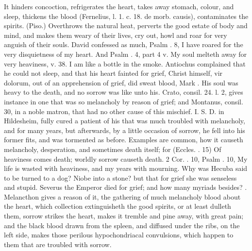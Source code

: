 {It hinders concoction, refrigerates the heart, takes away
stomach, colour, and sleep, thickens the blood (Fernelius, l. 1.
c. 18. \textlatin{de morb. causis}), contaminates the spirits. (Piso.)
Overthrows the natural heat, perverts the good estate of body and mind,
and makes them weary of their lives, cry out, howl and roar for very
anguish of their souls. David confessed as much, Psalm . 8, I
have roared for the very disquietness of my heart. And Psalm . 4,
part 4 v. My soul melteth away for very heaviness, v. 38. I am like a
bottle in the smoke. Antiochus complained that he could not sleep, and
that his heart fainted for grief, Christ himself, vir dolorum,
out of an apprehension of grief, did sweat blood, Mark . His soul
was heavy to the death, and no sorrow was like unto his. Crato, consil.
24. l. 2, gives instance in one that was so melancholy by reason of
grief; and Montanus, consil. 30, in a noble matron, that
had no other cause of this mischief. I. S. D. in Hildesheim, fully
cured a patient of his that was much troubled with melancholy, and for
many years, but afterwards, by a little occasion of sorrow, he
fell into his former fits, and was tormented as before. Examples are
common, how it causeth melancholy, desperation, and sometimes
death itself; for (Eccles. . 15) Of heaviness comes death;
worldly sorrow causeth death. 2 Cor. . 10, Psalm . 10, My life
is wasted with heaviness, and my years with mourning. Why was Hecuba
said to be turned to a dog? Niobe into a stone? but that for grief she
was senseless and stupid. Severus the Emperor  died for grief;
and how many myriads besides? . Melancthon gives a reason of it, the
gathering of much melancholy blood about the heart, which collection
extinguisheth the good spirits, or at least dulleth them, sorrow
strikes the heart, makes it tremble and pine away, with great pain; and
the black blood drawn from the spleen, and diffused under the ribs, on
the left side, makes those perilous hypochondriacal convulsions, which
happen to them that are troubled with sorrow.

}
